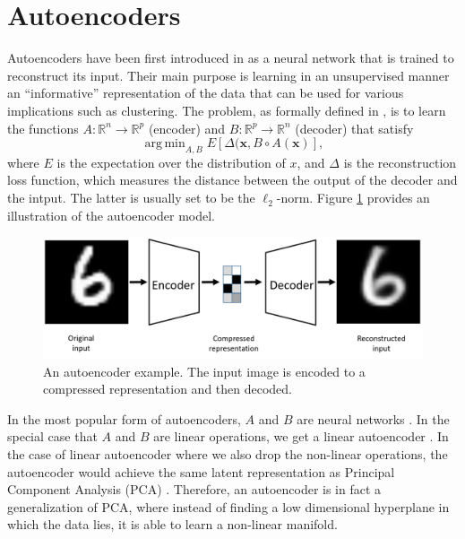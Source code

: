 \documentclass[graybox]{svmult}
\DeclareMathOperator{\argmin}{arg\,min}
\newcommand{\mb}[1]{\mathbf{#1}}
\newcommand{\bx}[0]{\mb{x}}
\begin{document}
\section{Autoencoders}
\label{sec:autoencoders}
Autoencoders have been first introduced in \cite{AutoEncoder_original} as a neural network that is trained to reconstruct its input. Their main purpose is learning in an unsupervised manner an ``informative'' representation of the data that can be used for various implications such as clustering. The problem, as formally defined in \cite{AutoEncoders_explanation}, is to learn the functions $A: \mathbb{R}^n \rightarrow \mathbb{R}^p$ (encoder) and $B: \mathbb{R}^p \rightarrow \mathbb{R}^n$ (decoder) that satisfy
\begin{equation}
\argmin_{A,B}E[\Delta(\bx, B\circ A (\bx)],
\end{equation}
where $E$ is the expectation over the distribution of $x$, and $\Delta$ is the reconstruction loss function, which measures the distance between the output of the decoder and the intput. The latter is usually set to be the $\ell_2$-norm. Figure \ref{fig:Autoencoder} provides an illustration of the autoencoder model.

\begin{figure}
    \centering
    \includegraphics[scale=0.3]{autoencoders.PNG}
    \caption{An autoencoder example. The input image is encoded to a compressed representation and then decoded.}
    \label{fig:Autoencoder}
\end{figure}

In the most popular form of autoencoders, $A$ and $B$ are neural networks \cite{NNAutoEncoder}.
In the special case that $A$ and $B$ are linear operations, we get a linear autoencoder \cite{linear_AutoEncoders}. In the case of linear autoencoder where we also drop the non-linear operations, the autoencoder would achieve the same latent representation as Principal Component Analysis (PCA) \cite{PCA_linearautoencoder}. Therefore, an autoencoder is in fact a generalization of PCA, where instead of finding a low dimensional hyperplane in which the data lies, it is able to learn a non-linear manifold.
\end{document}
